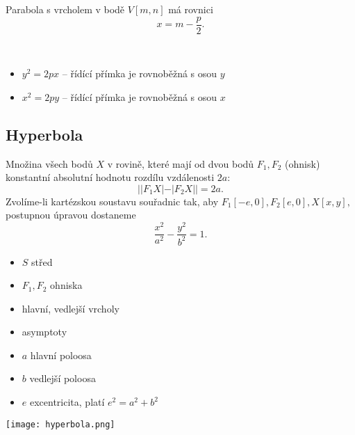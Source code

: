 \begin{pozn}
    Parabola s vrcholem v bodě $V[m,n]$ má rovnici
    $$x=m-\frac{p}{2}.$$
\end{pozn}

\begin{pozn}\,
\begin{itemize}
\item $y^2=2px$ -- řídící přímka je rovnoběžná s osou $y$
\item $x^2=2py$ -- řídící přímka je rovnoběžná s osou $x$
\end{itemize}
\end{pozn}

\subsection*{Hyperbola}
Množina všech bodů $X$ v rovině, které mají od dvou bodů $F_1, F_2$
(ohnisk) konstantní absolutní hodnotu rozdílu vzdálenosti $2a$:
$$||F_1X|-|F_2X||=2a.$$
Zvolíme-li kartézskou soustavu souřadnic tak, aby $F_1[-e,0], F_2[e,0],
X[x,y],$ postupnou úpravou dostaneme
$$\frac{x^2}{a^2}-\frac{y^2}{b^2}=1.$$

\begin{minipage}{0.48\linewidth}
\begin{itemize}
\item $S$ střed
\item $F_1,F_2$ ohniska
\item hlavní, vedlejší vrcholy
\item asymptoty
\item $a$ hlavní poloosa
\item $b$ vedlejší poloosa
\item $e$ excentricita, platí $e^2=a^2+b^2$
\end{itemize}
\end{minipage}
\hfill
\begin{minipage}{0.48\linewidth}
    \texttt{[image: hyperbola.png]}
\end{minipage}
